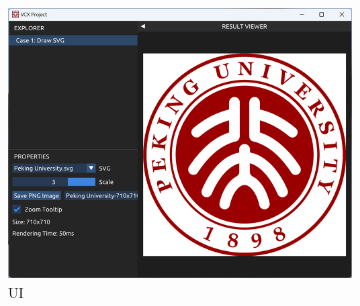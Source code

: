 \documentclass[UTF8]{ctexart}
\begin{document}
\begin{figure}[H]
    \centering
    \begin{subfigure}[b]{0.8\textwidth}
        \centering
        \includegraphics[width=\textwidth]{images/Screenshot.png}
        \caption{UI}
    \end{subfigure}
    \par\bigskip
    \begin{subfigure}[b]{0.3\textwidth}
        \centering

\end{subfigure}
\end{figure}
\end{document}
